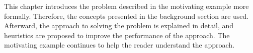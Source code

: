 This chapter introduces the problem described in the motivating example more formally. Therefore, the concepts presented in the background section are used. Afterward, the approach to solving the problem is explained in detail, and heuristics are proposed to improve the performance of the approach. The motivating example continues to help the reader understand the approach.
